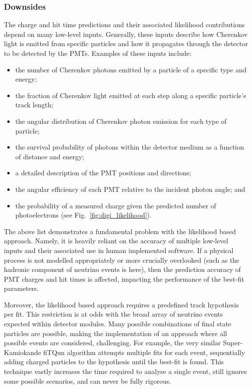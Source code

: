 \subsubsection*{Downsides} %

The charge and hit time predictions and their associated likelihood contributions depend on many
low-level inputs. Generally, these inputs describe how Cherenkov light is emitted from specific
particles and how it propagates through the detector to be detected by the PMTs. Examples of these
inputs include:
\begin{itemize}
    \item the number of Cherenkov photons emitted by a particle of a specific type and energy;
    \item the fraction of Cherenkov light emitted at each step along a specific particle's track
          length;
    \item the angular distribution of Cherenkov photon emission for each type of particle;
    \item the survival probability of photons within the detector medium as a function of distance
          and energy;
    \item a detailed description of the PMT positions and directions;
    \item the angular efficiency of each PMT relative to the incident photon angle; and
    \item the probability of a measured charge given the predicted number of photoelectrons (see
          Fig.~\ref{fig:digi_likelihood}).
\end{itemize}

The above list demonstrates a fundamental problem with the likelihood based approach. Namely, it
is heavily reliant on the accuracy of multiple low-level inputs and their associated use in human
implemented software. If a physical process is not modelled appropriately or more crucially
overlooked (such as the hadronic component of neutrino events is here), then the prediction
accuracy of PMT charges and hit times is affected, impacting the performance of the best-fit
parameters.

Moreover, the likelihood based approach requires a predefined track hypothesis per fit. This
restriction is at odds with the broad array of neutrino events expected within \chips detector
modules. Many possible combinations of final state particles are possible, making the
implementation of an approach where all possible events are considered, challenging. For example,
the very similar Super-Kamiokande fiTQun algorithm attempts multiple fits for each event,
sequentially adding charged particles to the hypothesis until the best-fit is found. This
technique vastly increases the time required to analyse a single event, still ignores some
possible scenarios, and can never be fully rigorous.

